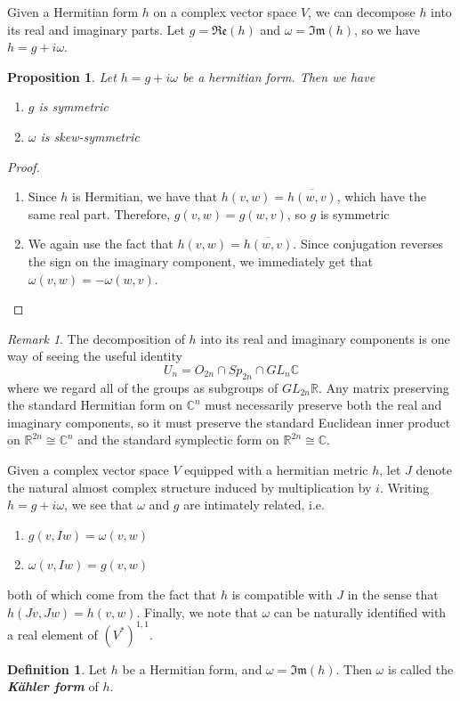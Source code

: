 \documentclass[psamsfonts, 12pt]{amsart}
\newtheorem{prop}[thm]{Proposition}
\theoremstyle{definition}
\newtheorem{defn}[thm]{Definition}
\theoremstyle{remark}
\newtheorem*{rem*}{Remark}
\newcommand{\R}{\mathbb{R}}
\newcommand{\ib}[1]{\textbf{\textit{#1}}}
\newcommand{\C}{\mathbb{C}}
\newcommand{\enumbreak}{\ \\ \vspace{-\baselineskip}}
\begin{document}
Given a Hermitian form $h$ on a complex vector space $V$, we can decompose $h$ into
its real and imaginary parts. Let $g = \mathfrak{Re}(h)$ and
$\omega = \mathfrak{Im}(h)$, so we have $h = g + i\omega$.
%
\begin{prop}
Let $h = g + i\omega$ be a hermitian form. Then we have
\begin{enumerate}
  \item $g$ is symmetric
  \item $\omega$ is skew-symmetric
\end{enumerate}
\end{prop}
%
\begin{proof}\enumbreak
\begin{enumerate}
  \item Since $h$ is Hermitian, we have that $h(v,w) = \overline{h(w,v)}$, which have
  the same real part. Therefore, $g(v,w) = g(w,v)$, so $g$ is symmetric
  \item We again use the fact that $h(v,w) = \overline{h(w,v)}$. Since conjugation
  reverses the sign on the imaginary component, we immediately get that
  $\omega(v,w) = -\omega(w,v)$.
\end{enumerate}
\end{proof}
%
\begin{rem*}
The decomposition of $h$ into its real and imaginary components is one way of seeing
the useful identity
\[
U_n = O_{2n} \cap Sp_{2n} \cap GL_n\C
\]
where we regard all of the groups as subgroups of $GL_{2n}\R$. Any matrix preserving
the standard Hermitian form on $\C^n$ must necessarily preserve both the real and
imaginary components, so it must preserve the standard Euclidean inner product on
$\R^{2n} \cong \C^n$ and the standard symplectic form on $\R^{2n} \cong \C$.
\end{rem*}
%
Given a complex vector space $V$ equipped with a hermitian metric $h$, let $J$
denote the natural almost complex structure induced by multiplication by $i$.
Writing $h = g + i\omega$, we see that $\omega$ and $g$ are intimately related, i.e.
\begin{enumerate}
  \item $g(v,Iw) = \omega(v,w)$
  \item $\omega(v,Iw) = g(v,w)$
\end{enumerate}
%
both of which come from the fact that $h$ is compatible with $J$ in the sense that
$h(Jv,Jw) = h(v,w)$. Finally, we note that $\omega$ can be naturally identified
with a real element of $(V^*)^{1,1}$.
%
\begin{defn}
Let $h$ be a Hermitian form, and $\omega = \mathfrak{Im}(h)$. Then $\omega$ is called
the \ib{K\"ahler form} of $h$.
\end{defn}
\end{document}
